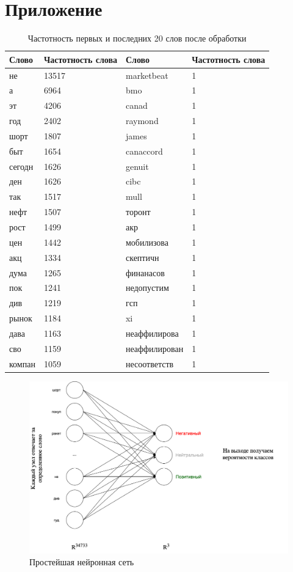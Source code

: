 \documentclass{article}
\begin{document}
\newpage
\section{Приложение}


\label{chap:additional}


\begin{table}[h]
	\caption{Частотность первых и последних 20 слов после обработки}
	\label{tab:table4}
	\centering
	\begin{tabular}{llll}
		\toprule
		Слово & Частотность слова &Слово & Частотность слова\\
		\midrule
		не & 13517 & marketbeat & 1\\ 
		а & 6964 & bmo & 1\\ 
		эт & 4206 & canad & 1\\ 
		год & 2402 & raymond & 1\\ 
		шорт & 1807 & james & 1\\ 
		быт & 1654 & canaccord & 1\\ 
		сегодн & 1626 & genuit & 1\\ 
		ден & 1626 & cibc & 1\\ 
		так & 1517 & mull & 1\\ 
		нефт & 1507 & торонт & 1\\ 
		рост & 1499 & акр & 1\\ 
		цен & 1442 & мобилизова & 1\\ 
		акц & 1334 & скептичн & 1\\ 
		дума & 1265 & финанасов & 1\\ 
		пок & 1241 & недопустим & 1\\ 
		див & 1219 & гсп & 1\\ 
		рынок & 1184 & xi & 1\\ 
		дава & 1163 & неаффилирова & 1\\ 
		сво & 1159 & неаффилирован & 1\\ 
		компан & 1059 & несоответств & 1\\
		\bottomrule
	\end{tabular}
	\label{tab:table3}
\end{table}

\begin{figure}[!h]
	\centering
	\caption{Простейшая нейронная сеть}
	\includegraphics[scale=0.3]{nn.png}
\end{figure}
\end{document}
